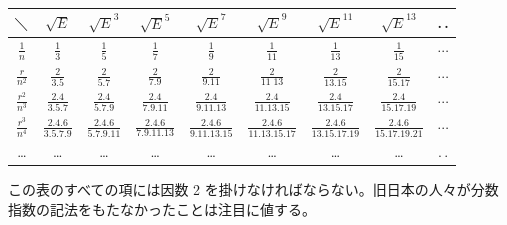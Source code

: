 \documentclass[11pt]{article}
\begin{document}
\begin{center}
\renewcommand{\arraystretch}{2.2}\setlength{\tabcolsep}{4pt}
\begin{tabular}{|c||c|c|c|c|c|c|c|c|}
\hline
$\diagdown$ & $\sqrt{E}$ & $\sqrt{E}^{3}$ & $\sqrt{E}^{5}$ & $\sqrt{E}^{7}$ & $\sqrt{E}^{9}$ & $\sqrt{E}^{11}$ & $\sqrt{E}^{13}$ & .\,.\\
\hline\hline
$\frac{1}{n}$ & $\frac{1}{3}$ & $\frac{1}{5}$ & $\frac{1}{7}$ & $\frac{1}{9}$ & $\frac{1}{11}$ & $\frac{1}{13}$ & $\frac{1}{15}$ & $\cdots$\\
\hline
$\frac{r}{n^2}$ & $\frac{2}{3.5}$ & $\frac{2}{5.7}$ & $\frac{2}{7.9}$ & $\frac{2}{9.11}$ & $\frac{2}{11\;13}$ & $\frac{2}{13.15}$ & $\frac{2}{15.17}$ & $\cdots$\\
\hline
$\frac{r^2}{n^3}$ & $\frac{2.4}{3.5.7}$ & $\frac{2.4}{5.7.9}$ & $\frac{2.4}{7.9.11}$ & $\frac{2.4}{9.11.13}$ & $\frac{2.4}{11.13.15}$ & $\frac{2.4}{13.15.17}$ & $\frac{2.4}{15.17.19}$ & $\cdots$\\
\hline
$\frac{r^3}{n^4}$ & $\frac{2.4.6}{3.5.7.9}$ & $\frac{2.4.6}{5.7.9.11}$ & $\frac{2.4.6}{7.9.11.13}$ & $\frac{2.4.6}{9.11.13.15}$ & $\frac{2.4.6}{11.13.15.17}$ & $\frac{2.4.6}{13.15.17.19}$ & $\frac{2.4.6}{15.17.19.21}$ & $\cdots$\\
\hline
\dots & \dots & \dots & \dots & \dots & \dots & \dots & \dots & .\,.\\
\hline
\end{tabular}
\end{center}

この表のすべての項には因数 2 を掛けなければならない。旧日本の人々が分数指数の記法をもたなかったことは注目に値する。
\end{document}
